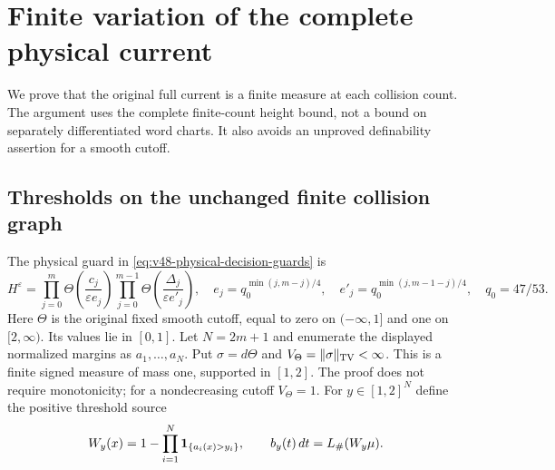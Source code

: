 \section{Finite variation of the complete physical current}
\label{sec:v73-finite-current}
We prove that the original full current is a finite measure at each
collision count. The argument uses the complete finite-count height
bound, not a bound on separately differentiated word charts. It also
avoids an unproved definability assertion for a smooth cutoff.

\subsection{Thresholds on the unchanged finite collision graph}
The physical guard in \eqref{eq:v48-physical-decision-guards} is
\[
 H^\varepsilon=\prod_{j=0}^m\Theta\left(\frac{c_j}{\varepsilon e_j}\right)
       \prod_{j=0}^{m-1}\Theta\left(\frac{\Delta_j}{\varepsilon e'_j}\right),
 \quad e_j=q_0^{\min(j,m-j)/4},\quad
 e'_j=q_0^{\min(j,m-1-j)/4},\quad q_0=47/53.
\]
Here $\Theta$ is the original fixed smooth cutoff, equal to zero
on $(-\infty,1]$ and one on $[2,\infty)$. Its values lie in $[0,1]$.
Let $N=2m+1$ and enumerate the displayed normalized margins as
$a_1,\ldots,a_N$. Put $\sigma=d\Theta$ and
$V_\Theta=\|\sigma\|_{\operatorname{TV}}<\infty$. This is a finite signed measure
of mass one, supported in $[1,2]$. The proof does not require
monotonicity; for a nondecreasing cutoff $V_\Theta=1$.
For $y\in[1,2]^N$ define the positive threshold source
\begin{equation}\label{eq:v73-threshold-source}
 W_y(x)=1-\prod_{i=1}^N\one_{\{a_i(x)>y_i\}},\qquad
 b_y(t)\,dt=L_\#(W_y\mu).
\end{equation}

